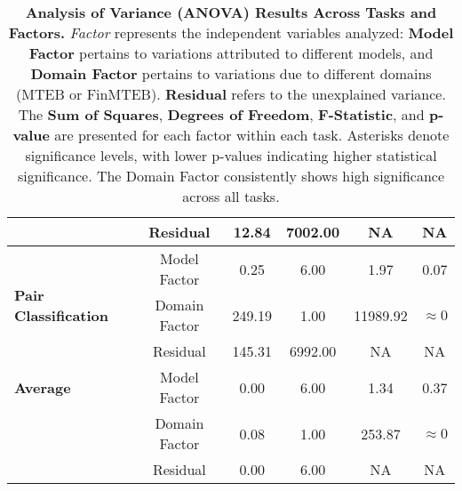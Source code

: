\begin{table}[htbp]
{\begin{tabular}{lccccc}
 & Residual        & 12.84    & 7002.00 & NA         & NA \\
\midrule
\multirow{3}{*}{\textbf{Pair Classification}} 
 & Model Factor    & 0.25     & 6.00    & 1.97       & 0.07 \\
 & Domain Factor   & 249.19   & 1.00    & 11989.92   & $\approx 0$ \\
 & Residual        & 145.31   & 6992.00 & NA         & NA \\
\midrule
\textbf{Average} 
 & Model Factor    & 0.00     & 6.00    & 1.34       & 0.37 \\
 & Domain Factor   & 0.08     & 1.00    & 253.87     & $\approx 0$ \\
 & Residual        & 0.00     & 6.00    & NA         & NA \\
\bottomrule
\end{tabular}
}
\caption{
\textbf{Analysis of Variance (ANOVA) Results Across Tasks and Factors.} 
\textit{Factor} represents the independent variables analyzed: \textbf{Model Factor} pertains to variations attributed to different models, and \textbf{Domain Factor} pertains to variations due to different domains (MTEB or FinMTEB). \textbf{Residual} refers to the unexplained variance. The \textbf{Sum of Squares}, \textbf{Degrees of Freedom}, \textbf{F-Statistic}, and \textbf{p-value} are presented for each factor within each task. Asterisks denote significance levels, with lower p-values indicating higher statistical significance. The Domain Factor consistently shows high significance across all tasks.
}
\label{tab:anova_results}
\end{table}